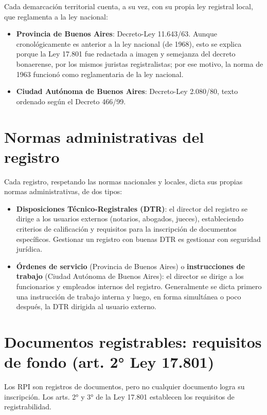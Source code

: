 \documentclass[12pt,oneside]{book}
\begin{document}
Cada demarcación territorial cuenta, a su vez, con su propia ley registral local, que reglamenta a la ley nacional:

\begin{itemize}
\item \textbf{Provincia de Buenos Aires}: Decreto-Ley 11.643/63. Aunque cronológicamente es anterior a la ley nacional (de 1968), esto se explica porque la Ley 17.801 fue redactada a imagen y semejanza del decreto bonaerense, por los mismos juristas registralistas; por ese motivo, la norma de 1963 funcionó como reglamentaria de la ley nacional.
\item \textbf{Ciudad Autónoma de Buenos Aires}: Decreto-Ley 2.080/80, texto ordenado según el Decreto 466/99.
\end{itemize}

\section{Normas administrativas del registro}

Cada registro, respetando las normas nacionales y locales, dicta sus propias normas administrativas, de dos tipos:

\begin{itemize}
\item \textbf{Disposiciones Técnico-Registrales (DTR)}: el director del registro se dirige a los usuarios externos (notarios, abogados, jueces), estableciendo criterios de calificación y requisitos para la inscripción de documentos específicos. Gestionar un registro con buenas DTR es gestionar con seguridad jurídica.
\item \textbf{Órdenes de servicio} (Provincia de Buenos Aires) o \textbf{instrucciones de trabajo} (Ciudad Autónoma de Buenos Aires): el director se dirige a los funcionarios y empleados internos del registro. Generalmente se dicta primero una instrucción de trabajo interna y luego, en forma simultánea o poco después, la DTR dirigida al usuario externo.
\end{itemize}

\section{Documentos registrables: requisitos de fondo (art. 2° Ley 17.801)}

Los RPI son registros de documentos, pero no cualquier documento logra su inscripción. Los arts. 2° y 3° de la Ley 17.801 establecen los requisitos de registrabilidad.
\end{document}
